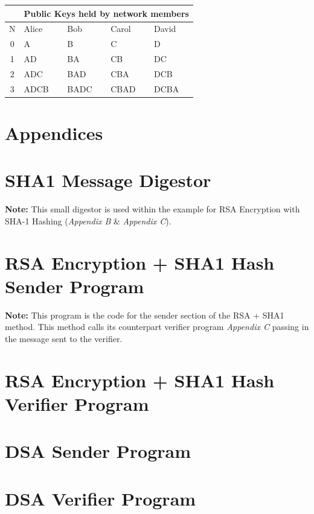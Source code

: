 \documentclass[a4paper, twoside, 11pt]{article}
\begin{document}
\begin{center}
	\begin{tabular}{ |c|l|l|l|l| } 
	 \hline
	 \multicolumn{1}{|c|}{}& \multicolumn {4}{|c|}{Public Keys held by network members} \\
	 \hline
   N & Alice & Bob & Carol & David \\
   \hline
   0 & A & B & C & D \\
   1 & AD & BA & CB & DC \\
   2 & ADC & BAD & CBA & DCB \\
   3 & ADCB & BADC & CBAD & DCBA \\
	 \hline
	\end{tabular}
\end{center}

\newpage
\section*{Appendices}
\appendix
\section{SHA1 Message Digestor}
\textbf{Note:} This small digestor is used within the example for RSA Encryption with SHA-1 Hashing (\textit{Appendix B} \& \textit{Appendix C}).

\newpage
\section{RSA Encryption + SHA1 Hash Sender Program}
\textbf{Note:} This program is the code for the sender section of the RSA + SHA1 method. This method calls its counterpart verifier program \textit{Appendix C} passing in the message sent to the verifier.

\newpage
\section{RSA Encryption + SHA1 Hash Verifier Program}

\newpage
\section{DSA Sender Program}

\newpage
\section{DSA Verifier Program}

\newpage
\end{document}
